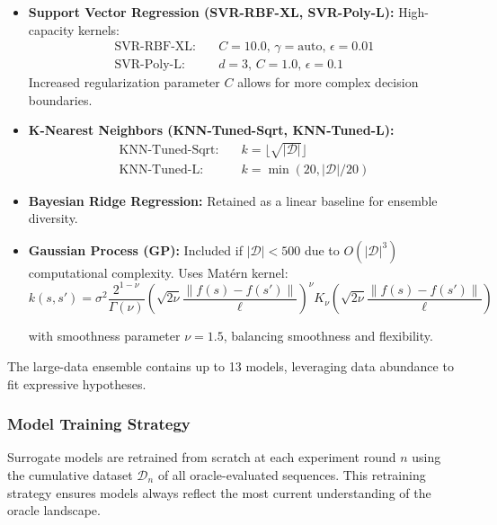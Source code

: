 \documentclass[conference]{IEEEtran}
\begin{document}
\begin{itemize}
    \item \textbf{Support Vector Regression (SVR-RBF-XL, SVR-Poly-L):} High-capacity kernels:
    \begin{align}
    \text{SVR-RBF-XL:} \quad & C = 10.0, \, \gamma = \text{auto}, \, \epsilon = 0.01 \\
    \text{SVR-Poly-L:} \quad & d = 3, \, C = 1.0, \, \epsilon = 0.1
    \end{align}
    Increased regularization parameter $C$ allows for more complex decision boundaries.
    
    \item \textbf{K-Nearest Neighbors (KNN-Tuned-Sqrt, KNN-Tuned-L):} 
    \begin{align}
    \text{KNN-Tuned-Sqrt:} \quad & k = \lfloor \sqrt{|\mathcal{D}|} \rfloor \\
    \text{KNN-Tuned-L:} \quad & k = \min(20, |\mathcal{D}|/20)
    \end{align}
    
    \item \textbf{Bayesian Ridge Regression:} Retained as a linear baseline for ensemble diversity.
    
    \item \textbf{Gaussian Process (GP):} Included if $|\mathcal{D}| < 500$ due to $O(|\mathcal{D}|^3)$ computational complexity. Uses Matérn kernel:
    \begin{equation}
k(s, s') = \sigma^2 \frac{2^{1-\nu}}{\Gamma(\nu)} \left(\sqrt{2\nu}\frac{\lVert f(s) - f(s') \rVert}{\ell}\right)^\nu K_\nu\left(\sqrt{2\nu}\frac{\lVert f(s) - f(s') \rVert}{\ell}\right)
\end{equation}

    with smoothness parameter $\nu = 1.5$, balancing smoothness and flexibility.
\end{itemize}

The large-data ensemble contains up to 13 models, leveraging data abundance to fit expressive hypotheses.

\subsubsection{Model Training Strategy}

Surrogate models are retrained from scratch at each experiment round $n$ using the cumulative dataset $\mathcal{D}_n$ of all oracle-evaluated sequences. This retraining strategy ensures models always reflect the most current understanding of the oracle landscape.
\end{document}
